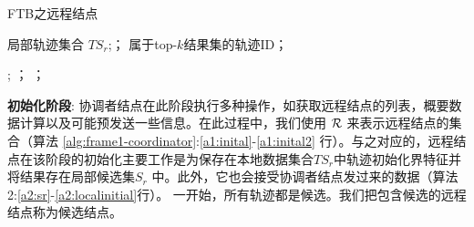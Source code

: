 \begin{algorithm}[t]
	\caption{FTB之远程结点}
	\label{alg:frame1-remote}
	\begin{algorithmic}[1]
		\REQUIRE 局部轨迹集合 $TS_{r}$;；
		\ENSURE 属于top-$k$结果集的轨迹ID；
		
				 \label{a2:m2Info}
					 ;
				\label{a2:gkub}
							\RETURN；	\label{a2:sendbreak} 
						\ENDIF
			\ELSE %
				\RETURN	； \label{a2:localreturn}
			\ENDIF
		\ENDWHILE
	\end{algorithmic}
\end{algorithm}

\textbf{初始化阶段}: 协调者结点在此阶段执行多种操作，如获取远程结点的列表，概要数据计算以及可能预发送一些信息。在此过程中，我们使用
$\cal R$ 来表示远程结点的集合（算法 \ref{alg:frame1-coordinator}:\ref{a1:inital}-\ref{a1:inital2}  行）。与之对应的，远程结点在该阶段的初始化主要工作是为保存在本地数据集合$TS_{r}$中轨迹初始化界特征并将结果存在局部候选集$S_{r}$ 中。此外，它也会接受协调者结点发过来的数据（算法2:\ref{a2:sr}-\ref{a2:localinitial}行）。
一开始，所有轨迹都是候选。我们把包含候选的远程结点称为候选结点。



